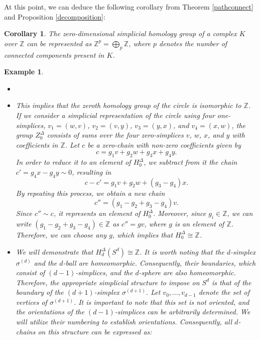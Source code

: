 \documentclass{amsart}
\newtheorem{corollary}[definition]{Corollary}
\newtheorem{example}[definition]{Example}
\begin{document}
At this point, we can deduce the following corollary from Theorem \ref{pathconnect} and Proposition \ref{decomposition}:

\begin{corollary}
\label{directsum0hom}
The zero-dimensional simplicial homology group of a complex $K$ over $\mathbb{Z}$ can be represented as $\mathbb{Z}^p = \bigoplus_p \mathbb{Z}$, where $p$ denotes the number of connected components present in $K$.
\end{corollary}

\begin{example}
\begin{itemize}
	\item[]
	\item This implies that the zeroth homology group of the circle is isomorphic to $\mathbb{Z}$. If we consider a simplicial representation of the circle using four one-simplices, $v_1 = (w,v)$, $v_2 = (v,y)$, $v_3 = (y,x)$, and $v_4 = (x,w)$, the group $Z_0^\Delta$ consists of sums over the four zero-simplices $v$, $w$, $x$, and $y$ with coefficients in $\mathbb{Z}$. Let $c$ be a zero-chain with non-zero coefficients given by
	\begin{equation}
	c = g_1v+g_2w+g_3x+g_4y.
	\end{equation}
	In order to reduce it to an element of $H^\Delta_0$, we subtract from it the chain $c' = g_4x-g_4y \sim 0$, resulting in
	\begin{equation}
	c-c' = g_1v+g_2w +(g_3-g_4)x.
	\end{equation}
	By repeating this process, we obtain a new chain
	\begin{equation}
	c'' = (g_1-g_2+g_3-g_4)v.
	\end{equation}
	Since $c'' \sim c$, it represents an element of $H^\Delta_0$. Moreover, since $g_i \in \mathbb{Z}$, we can write $(g_1-g_2+g_3-g_4) \in \mathbb{Z}$ as $c'' = gv$, where $g$ is an element of $\mathbb{Z}$. Therefore, we can choose any $g$, which implies that $H^\Delta_0 \cong \mathbb{Z}$.
	\item We will demonstrate that $H^\Delta_d(S^d) \cong \mathbb{Z}$. It is worth noting that the $d$-simplex $\sigma^{(d)}$ and the $d$-ball are homeomorphic. Consequently, their boundaries, which consist of $(d-1)$-simplices, and the $d$-sphere are also homeomorphic. Therefore, the appropriate simplicial structure to impose on $S^d$ is that of the boundary of the $(d+1)$-simplex $\sigma^{(d+1)}$. Let ${v_0,\ldots,v_{d-1}}$ denote the set of vertices of $\sigma^{(d+1)}$. It is important to note that this set is not oriented, and the orientations of the $(d-1)$-simplices can be arbitrarily determined. We will utilize their numbering to establish orientations. Consequently, all $d$-chains on this structure can be expressed as:

\end{itemize}
\end{example}
\end{document}
